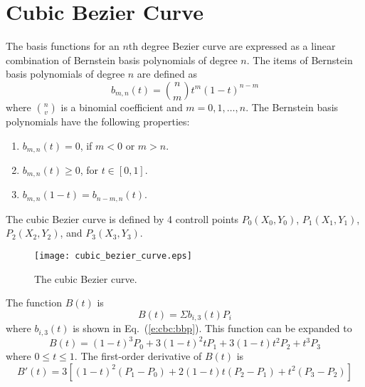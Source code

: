 \documentclass{turgon}
\begin{document}
\chapter{Cubic Bezier Curve}


The basis functions for an $n$th degree Bezier curve are expressed as a linear
combination of Bernstein basis polynomials of degree $n$. The items of Bernstein
basis polynomials of degree $n$ are defined as
\begin{equation}
    b_{m, n}(t) = {n \choose m} t^m (1 - t)^{n - m}
    \label{e:cbc:bbp}
\end{equation}
where ${n \choose v}$ is a binomial coefficient and $m=0,1, \dots ,n$. The
Bernstein basis polynomials have the following properties:
\begin{enumerate}
    \item
    $b_{m, n}(t) = 0$, if $m < 0$ or $m > n$.
    \item
    $b_{m, n}(t) \geq 0$, for $t \in [0, 1]$.
    \item
    $b_{m, n}(1 - t) = b_{n - m, n}(t)$.
\end{enumerate}
The cubic Bezier curve is defined by 4 controll points $P_0(X_0, Y_0)$,
$P_1(X_1, Y_1)$, $P_2(X_2, Y_2)$, and $P_3(X_3, Y_3)$.
\begin{figure}[h]
    \centering
    \texttt{[image: cubic\_bezier\_curve.eps]}
    \caption{The cubic Bezier curve.}
    \label{f:cubic_bezier_curve}
\end{figure}
The function $B(t)$ is
\begin{equation*}
    B(t) = \Sigma b_{i,3}(t)P_i
\end{equation*}
where $b_{i,3}(t)$ is shown in Eq.~(\ref{e:cbc:bbp}). This function can be
expanded to
\begin{equation}
    B(t) = (1-t)^3 P_0 + 3(1-t)^2 t P_1 + 3(1-t) t^2 P_2 + t^3 P_3
    \label{e:cbc:der0}
\end{equation}
where $0 \leq t \leq 1$.  The first-order derivative of $B(t)$ is
\begin{equation*}
    B'(t) = 3\left[
      (1-t)^2 (P_1 - P_0) + 2(1-t)t(P_2 - P_1) + t^2(P_3 - P_2)
    \right]
\end{equation*}
\end{document}

